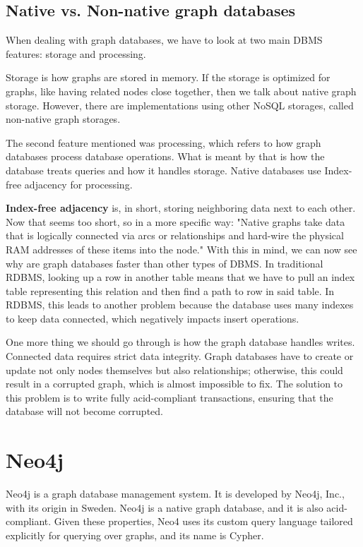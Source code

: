 \subsection {Native vs. Non-native graph databases}

When dealing with graph databases, we have to look at two main DBMS features: storage and processing.

Storage is how graphs are stored in memory. If the storage is optimized for graphs, like having related nodes close together, then we talk about native graph storage. However, there are implementations using other NoSQL storages, called non-native graph storages.

The second feature mentioned was processing, which refers to how graph databases process database operations. What is meant by that is how the database treats queries and how it handles storage. Native databases use Index-free adjacency for processing.
\cite{chao_graph_2018}

\textbf{Index-free adjacency} is, in short, storing neighboring data next to each other. Now that seems too short, so in a more specific way:
"Native graphs take data that is logically connected via arcs or relationships and hard-wire the physical RAM addresses of these items into the node."
\cite{mccreary_neighborhood_2021} With this in mind, we can now see why are graph databases faster than other types of DBMS.
In traditional RDBMS, looking up a row in another table means that we have to pull an index table representing this relation and then find a path to row in said table.
In RDBMS, this leads to another problem because the database uses many indexes to keep data connected, which negatively impacts insert operations.

One more thing we should go through is how the graph database handles writes. Connected data requires strict data integrity.
Graph databases have to create or update not only nodes themselves but also relationships; otherwise, this could result in a corrupted graph, which is almost impossible to fix.
The solution to this problem is to write fully \acrshort{acid}-compliant transactions, ensuring that the database will not become corrupted.
\cite{chao_graph_2018}

\section{Neo4j}

Neo4j is a graph database management system. It is developed by Neo4j, Inc., with its origin in Sweden. \cite{noauthor_company_nodate}
Neo4j is a native graph database, and it is also \acrshort{acid}-compliant. Given these properties, Neo4 uses its custom query language tailored explicitly for querying over graphs,
and its name is Cypher. \cite{noauthor_neo4j_nodate-2}

